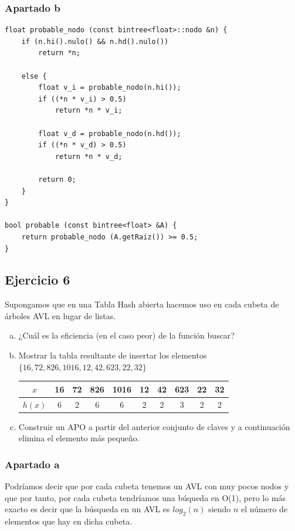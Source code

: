 \documentclass[10pt,a4paper,spanish]{report}
\begin{document}
\subsubsection{\textcolor[rgb]{0.5,0.8,1}Apartado b}

\begin{verbatim}
float probable_nodo (const bintree<float>::nodo &n) {
    if (n.hi().nulo() && n.hd().nulo())
        return *n;

    else {
        float v_i = probable_nodo(n.hi());
        if ((*n * v_i) > 0.5)
            return *n * v_i;

        float v_d = probable_nodo(n.hd());
        if ((*n * v_d) > 0.5)
            return *n * v_d;

        return 0; 
    }
}

bool probable (const bintree<float> &A) {
    return probable_nodo (A.getRaiz()) >= 0.5;
}
\end{verbatim}

\subsection{\textcolor[rgb]{0.5,0.8,1}Ejercicio 6}
\noindent
Supongamos que en una Tabla Hash abierta hacemos uso en cada cubeta de árboles AVL en lugar de listas.
\begin{enumerate}[a)]
      \item ¿Cuál es la eficiencia (en el caso peor) de la función buscar?
      \item Mostrar la tabla resultante de insertar los elementos $\{16,72,826,1016,12,42,623,22,32\}$
      \begin{tabular}{|c|c|c|c|c|c|c|c|c|c|}
      \hline
      $x$ & 16 & 72 & 826 & 1016 & 12 & 42 & 623 & 22 & 32 \\
      \hline
      $h(x)$ & 6 & 2 & 6 & 6 & 2 & 2 & 3 & 2 & 2 \\
      \hline
      \end{tabular}
      \item Construir un APO a partir del anterior conjunto de claves y a continuación elimina el elemento más pequeño.
\end{enumerate}

\subsubsection{\textcolor[rgb]{0.5,0.8,1}Apartado a}
\noindent
Podríamos decir que por cada cubeta tenemos un AVL con muy pocos nodos y que por tanto, por cada cubeta tendríamos una búqueda en O(1), pero lo más exacto es decir que la búsqueda en un AVL es $log_2 (n)$ siendo $n$ el número de elementos que hay en dicha cubeta.
\end{document}
